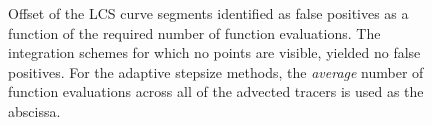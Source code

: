 \begin{figure}[htpb]
    \centering
    
    \caption[Offset of the LCS curve segments identified as false positives,
    as a function of the required number of function evaluations]
    {Offset of the LCS curve segments identified as false positives as a
        function of the required number of function evaluations. The
        integration schemes for which no points are visible, yielded
        no false positives. For the adaptive stepsize methods, the
        \emph{average} number of function evaluations across all of the advected
    tracers is used as the abscissa.}
    \label{fig:lcs_err_fp_fp}
\end{figure}
